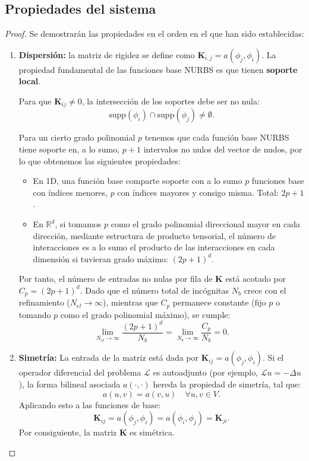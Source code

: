 \documentclass[11pt]{book}
\theoremstyle{plain} %
\theoremstyle{definition} %
\theoremstyle{definition} %
\begin{document}
\subsection{Propiedades del sistema}
\label{prop_sistema}
\begin{proof}Se demostrarán las propiedades en el orden en el que han sido establecidas:
    \begin{enumerate}
        \item \textbf{Dispersión:} la matriz de rigidez se define como $\mathbf{K}_{i,j} = a(\phi_j, \phi_i)$. La propiedad fundamental de las funciones base NURBS es que tienen \textbf{soporte local}.
        
        Para que $\mathbf{K}_{ij} \neq 0$, la intersección de los soportes debe ser no nula:
        $$ \text{supp}(\phi_i) \cap \text{supp}(\phi_j) \neq \emptyset. $$
        
        Para un cierto grado polinomial $p$ tenemos que cada función base NURBS tiene soporte en, a lo sumo, $p+1$ intervalos no nulos del vector de nudos, por lo que obtenemos las siguientes propiedades:
        \begin{itemize}
            \item En 1D, una función base comparte soporte con a lo sumo $p$ funciones base con índices menores, $p$ con índices mayores y consigo misma. Total: $2p+1$.
            \item En $\mathbb{R}^d$, si tomamos $p$ como el grado polinomial direccional mayor en cada dirección, mediante estructura de producto tensorial, el número de interacciones es a lo sumo el producto de las interacciones en cada dimensión si tuvieran grado máximo: $(2p+1)^d$.
        \end{itemize}
        Por tanto, el número de entradas no nulas por fila de $\mathbf{K}$ está acotado por $C_p = (2p+1)^d$. Dado que el número total de incógnitas $N_b$ crece con el refinamiento ($N_{el} \to \infty$), mientras que $C_p$ permanece constante (fijo $p$ o tomando $p$ como el grado polinomial máximo), se cumple:
        $$ \lim_{N_{el} \to \infty} \frac{(2p+1)^d}{N_b} = \lim_{N_{b} \to \infty} \frac{C_p}{N_b} = 0. $$

        \item \textbf{Simetría:}
        La entrada de la matriz está dada por $\mathbf{K}_{ij} = a(\phi_j, \phi_i)$.
        Si el operador diferencial del problema $\mathcal{L}$ es autoadjunto (por ejemplo, $\mathcal{L}u = -\Delta u$), la forma bilineal asociada $a(\cdot, \cdot)$ hereda la propiedad de simetría, tal que:
        $$ a(u, v) = a(v, u) \quad \forall u, v \in V. $$
        Aplicando esto a las funciones de base:
        $$ \mathbf{K}_{ij} = a(\phi_j, \phi_i) = a(\phi_i, \phi_j) = \mathbf{K}_{ji}. $$
        Por consiguiente, la matriz $\mathbf{K}$ es simétrica.


\end{enumerate}
\end{proof}
\end{document}
